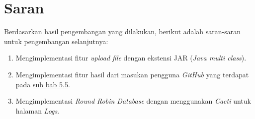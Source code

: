 \section{Saran}
Berdasarkan hasil pengembangan yang dilakukan, berikut adalah saran-saran untuk pengembangan selanjutnya:
\begin{enumerate}
	\item Mengimplementasi fitur \textit{upload file} dengan ekstensi JAR (\textit{Java multi class}).
	\item Mengimplementasi fitur hasil dari masukan pengguna \textit{GitHub} yang terdapat pada \hyperref[sec:masukangithub]{sub bab 5.5}.
	\item Mengimplementasi \textit{Round Robin Database} dengan menggunakan \textit{Cacti} untuk halaman \textit{Logs}.
\end{enumerate}